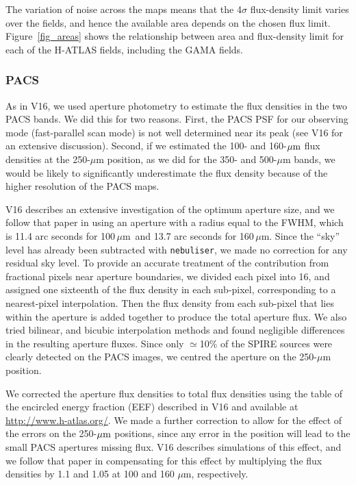 \documentclass[a4paper,fleqn,usenatbib, twocolumn]{aastex61}
\def\mic{\,$\mu $m}
\begin{document}
The variation of noise across the maps means that the 4$\sigma$
flux-density limit varies over the fields, and hence the available
area depends on the chosen flux limit. Figure~\ref{fig_areas}
shows the relationship between area and flux-density limit for each of
the H-ATLAS fields, including the GAMA fields.



\subsubsection{PACS}

As in V16, we used aperture photometry to estimate the flux densities
in the two PACS bands. We did this for two reasons. First, the PACS
PSF for our observing mode (fast-parallel scan mode) is not well
determined near its peak (see V16 for an extensive
discussion). Second, if we estimated the 100- and 160-$\mbox{$\mu$m}$ flux
densities at the 250-$\mu$m position, as we did for the 350- and
500-$\mu$m bands, we would be likely to significantly underestimate
the flux density because of the higher resolution of the PACS maps.

V16 describes an extensive investigation of the optimum aperture size,
and we follow that paper in using an aperture with a radius equal to
the FWHM, which is 11.4 arc seconds for 100\mic\ and 13.7 arc seconds
for 160\mic. Since the ``sky'' level has already been subtracted with
{\tt nebuliser}, we made no correction for any residual sky level.  To
provide an accurate treatment of the contribution from fractional
pixels near aperture boundaries, we divided each pixel into 16, and
assigned one sixteenth of the flux density in each sub-pixel,
corresponding to a nearest-pixel interpolation. Then the flux density
from each sub-pixel that lies within the aperture is added together to
produce the total aperture flux.  We also tried bilinear, and bicubic
interpolation methods and found negligible differences in the
resulting aperture fluxes.  Since only $\simeq$10\% of the SPIRE
sources were clearly detected on the PACS images, we centred the
aperture on the 250-$\mu$m position.

We corrected the aperture flux densities to total flux densities using
the table of the encircled energy fraction (EEF) described in V16 and
available at \url{http://www.h-atlas.org/}.  We made a further
correction to allow for the effect of the errors on the 250-$\mbox{$\mu$m}$
positions, since any error in the position will lead to the small PACS
apertures missing flux. V16 describes simulations of this effect, and
we follow that paper in compensating for this effect by multiplying
the flux densities by 1.1 and 1.05 at 100 and 160 $\mu$m,
respectively.
\end{document}
